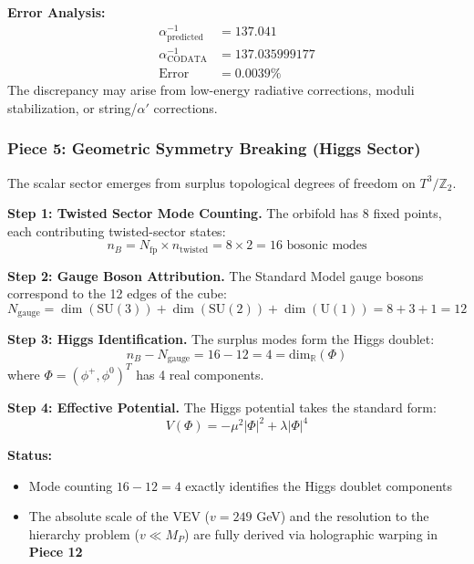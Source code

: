 \documentclass[12pt,a4paper]{article}
\newcommand{\Ztwo}{\mathbb{Z}_2}
\newcommand{\Tthree}{T^3}
\begin{document}
\textbf{Error Analysis:}
\begin{align}
\alpha^{-1}_{\text{predicted}} &= 137.041 \\
\alpha^{-1}_{\text{CODATA}} &= 137.035999177 \\
\text{Error} &= 0.0039\%
\end{align}
The discrepancy may arise from low-energy radiative corrections, moduli stabilization, or string/$\alpha'$ corrections.

\subsubsection{Piece 5: Geometric Symmetry Breaking (Higgs Sector)}

The scalar sector emerges from surplus topological degrees of freedom on $\Tthree/\Ztwo$.

\textbf{Step 1: Twisted Sector Mode Counting.}
The orbifold has 8 fixed points, each contributing twisted-sector states:
\begin{equation}
n_B = N_{\text{fp}} \times n_{\text{twisted}} = 8 \times 2 = 16 \text{ bosonic modes}
\end{equation}

\textbf{Step 2: Gauge Boson Attribution.}
The Standard Model gauge bosons correspond to the 12 edges of the cube:
\begin{equation}
N_{\text{gauge}} = \dim(\text{SU}(3)) + \dim(\text{SU}(2)) + \dim(\text{U}(1)) = 8 + 3 + 1 = 12
\end{equation}

\textbf{Step 3: Higgs Identification.}
The surplus modes form the Higgs doublet:
\begin{equation}
n_B - N_{\text{gauge}} = 16 - 12 = 4 = \text{dim}_\mathbb{R}(\Phi)
\end{equation}
where $\Phi = (\phi^+, \phi^0)^T$ has 4 real components.

\textbf{Step 4: Effective Potential.}
The Higgs potential takes the standard form:
\begin{equation}
V(\Phi) = -\mu^2|\Phi|^2 + \lambda|\Phi|^4
\end{equation}

\textbf{Status:}
\begin{itemize}[itemsep=0pt]
    \item[\checkmark] Mode counting $16 - 12 = 4$ exactly identifies the Higgs doublet components
    \item[\checkmark] The absolute scale of the VEV ($v = 249$ GeV) and the resolution to the hierarchy problem ($v \ll M_P$) are fully derived via holographic warping in \textbf{Piece 12}
\end{itemize}
\end{document}
